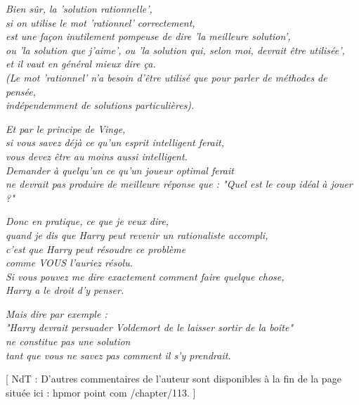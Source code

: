\begin{center}\emph{Bien sûr, la 'solution rationnelle',} \\\emph{si on utilise le mot 'rationnel' correctement,} \\\emph{est une façon inutilement pompeuse de dire 'la meilleure solution',} \\\emph{ou 'la solution que j'aime', ou 'la solution qui, selon moi, devrait être utilisée',} \\\emph{et il vaut en général mieux dire ça.} \\\emph{(Le mot 'rationnel' n'a besoin d'être utilisé que pour parler de méthodes de pensée,} \\\emph{indépendemment de solutions particulières). } \end{center}



\begin{center}\emph{Et par le principe de Vinge,} \\\emph{si vous savez déjà ce qu'un esprit intelligent ferait,} \\\emph{vous devez être au moins aussi intelligent.} \\\emph{Demander à quelqu'un ce qu'un joueur optimal ferait} \\\emph{ne devrait pas produire de meilleure réponse que : "Quel est le coup idéal à jouer ?" } \end{center}



\begin{center}\emph{Donc en pratique, ce que je veux dire,} \\\emph{quand je dis que Harry peut revenir un rationaliste accompli,} \\\emph{c'est que Harry peut résoudre ce problème} \\\emph{comme VOUS l'auriez résolu.} \\\emph{Si vous pouvez me dire exactement comment faire quelque chose,} \\\emph{Harry a le droit d'y penser. } \end{center}



\begin{center}\emph{Mais dire par exemple :} \\\emph{"Harry devrait persuader Voldemort de le laisser sortir de la boîte"} \\\emph{ne constitue pas une solution} \\\emph{tant que vous ne savez pas comment il s'y prendrait. } \end{center}


[ NdT : D'autres commentaires de l'auteur sont disponibles à la fin de la page située ici : hpmor point com /chapter/113. ]

